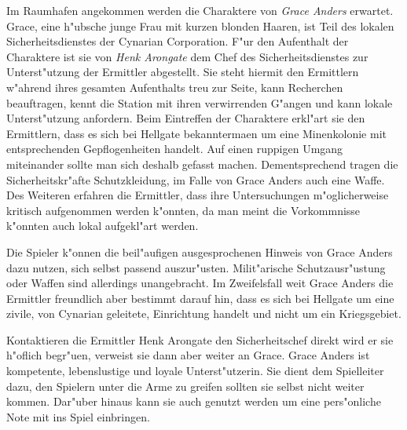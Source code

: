 Im Raumhafen angekommen werden die Charaktere von \emph{Grace Anders} erwartet. Grace, eine h"ubsche junge Frau mit kurzen blonden Haaren, ist Teil des lokalen Sicherheitsdienstes der Cynarian Corporation. F"ur den Aufenthalt der Charaktere ist sie von \emph{Henk Arongate} dem Chef des Sicherheitsdienstes zur Unterst"utzung der Ermittler abgestellt. Sie steht hiermit den Ermittlern w"ahrend ihres gesamten Aufenthalts treu zur Seite, kann Recherchen beauftragen, kennt die Station mit ihren verwirrenden G"angen und kann lokale Unterst"utzung anfordern. Beim Eintreffen der Charaktere erkl"art sie den Ermittlern, dass es sich bei Hellgate bekannterma\3en um eine Minenkolonie mit entsprechenden Gepflogenheiten handelt. Auf einen ruppigen Umgang miteinander sollte man sich deshalb gefasst machen. Dementsprechend tragen die Sicherheitskr"afte Schutzkleidung, im Falle von Grace Anders auch eine Waffe. Des Weiteren erfahren die Ermittler, dass ihre Untersuchungen m"oglicherweise kritisch aufgenommen werden k"onnten, da man meint die Vorkommnisse k"onnten auch lokal aufgekl"art werden.

\begin{remarks}
	Die Spieler k"onnen die beil"aufigen ausgesprochenen Hinweis von Grace Anders dazu nutzen, sich selbst passend auszur"usten. Milit"arische Schutzausr"ustung oder Waffen sind allerdings unangebracht. Im Zweifelsfall wei\3t Grace Anders die Ermittler freundlich aber bestimmt darauf hin, dass es sich bei Hellgate um eine zivile, von Cynarian geleitete, Einrichtung handelt und nicht um ein Kriegsgebiet. 
	
	Kontaktieren die Ermittler Henk Arongate den Sicherheitschef direkt wird er sie h"oflich begr"u\3en, verweist sie dann aber weiter an Grace. Grace Anders ist kompetente, lebenslustige und loyale Unterst"utzerin. Sie dient dem Spielleiter dazu, den Spielern unter die Arme zu greifen sollten sie selbst nicht weiter kommen. Dar"uber hinaus kann sie auch genutzt werden um eine pers"onliche Note mit ins Spiel einbringen.
\end{remarks}


